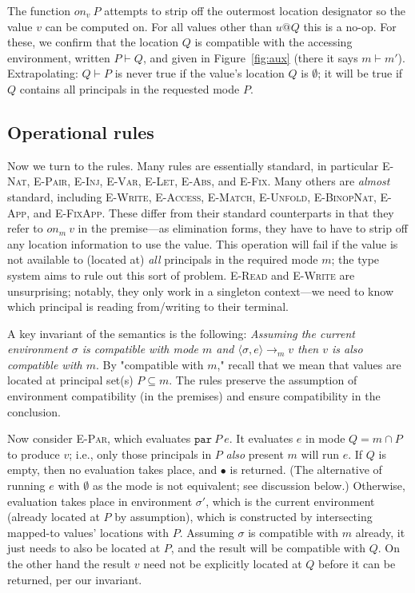 \documentclass[10pt]{article}
\makeatletter
\newcommand{\rulelab}[1]{{\small \textsc{#1}}}
\newcommand{\kw}[1]{\ensuremath{\mathtt{#1}}}
\newcommand{\epar}[2]{\ensuremath{\kw{par}~{#1}~{#2}}}
\newcommand{\vloc}[2]{\ensuremath{{#1}\kw{@}{#2}}}
\newcommand{\vcrash}{\ensuremath{\bullet}}
\newcommand{\eval}[4]{\ensuremath{\config{#1}{#3} \longrightarrow_{#2} {#4}}}
\newcommand{\env}{\ensuremath{\sigma}}
\newcommand{\config}[2]{\ensuremath{\langle{#1},{#2}\rangle}}
\newcommand{\getat}[2]{\ensuremath{\mathit{on}_{#1}~{#2}}}
\makeatother
\begin{document}
The function $\getat{v}{P}$ attempts to strip off the outermost
location designator so the value $v$ can be computed on. For all
values other than $\vloc{u}{Q}$ this is a no-op. For these, we confirm
that the location $Q$ is compatible with the accessing environment,
written $P \vdash Q$, and given in Figure~\ref{fig:aux} (there it says
$m \vdash m'$). Extrapolating: $Q \vdash P$ is never true if the value's
location $Q$ is $\emptyset$; it will be true if $Q$ contains all
principals in the requested mode $P$.

\subsection{Operational rules}

Now we turn to the rules. Many rules are essentially standard, in
particular \rulelab{E-Nat}, \rulelab{E-Pair}, \rulelab{E-Inj},
\rulelab{E-Var}, \rulelab{E-Let}, \rulelab{E-Abs}, and \rulelab{E-Fix}. Many others are
\emph{almost} standard, including \rulelab{E-Write}, \rulelab{E-Access},
\rulelab{E-Match}, \rulelab{E-Unfold}, \rulelab{E-BinopNat}, 
\rulelab{E-App}, and \rulelab{E-FixApp}. These differ from their
standard counterparts in that 
they refer to $\getat{m}{v}$ in the premise---as elimination forms,
they have to have to strip off any location information to use the
value. This operation will fail if the value is not available to
(located at) \emph{all} principals in the required mode $m$; the type system
aims to rule out this sort of problem. \rulelab{E-Read} and
\rulelab{E-Write} are unsurprising; notably, they only work in a
singleton context---we need to know 
which principal is reading from/writing to their terminal. 

A key invariant of the semantics is the following: \emph{Assuming the
  current environment $\sigma$ is compatible with mode
  $m$ and $\eval{\env}{m}{e}{v}$ then $v$ is also compatible with $m$}. By
"compatible with $m$," recall that we mean that values are located at
principal set(s) $P \subseteq m$. The rules preserve the assumption of
environment compatibility (in the premises) and ensure compatibility
in the conclusion.

Now consider \rulelab{E-Par}, which evaluates $\epar{P}{e}$. It
evaluates $e$ in mode $Q = m \cap P$ to produce $v$; i.e., only those
principals in $P$ \emph{also} present $m$ will run $e$. If $Q$ is
empty, then no evaluation takes place, and $\vcrash$ is returned.
(The alternative of running $e$ with $\emptyset$ as the mode is not
equivalent; see discussion below.)  Otherwise, evaluation takes place
in environment $\sigma'$, which is the current environment (already
located at $P$ by assumption), which is constructed by intersecting
mapped-to values' locations with $P$. Assuming $\sigma$ is compatible
with $m$ already, it just needs to also be located at $P$, and the
result will be compatible with $Q$. On the other hand the result $v$
need not be explicitly located at $Q$ before it can be returned, per
our invariant.
\end{document}
